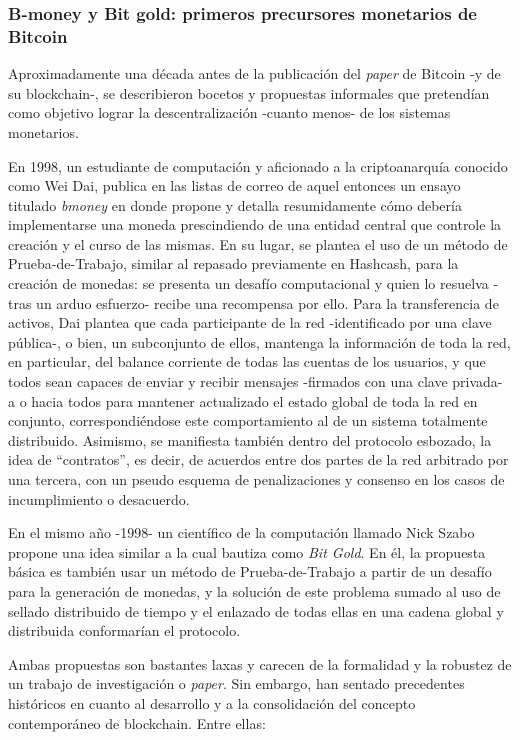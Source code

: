 \subsubsection{B-money y Bit gold: primeros precursores monetarios de Bitcoin}
\label{bc_origins_bmbg}

Aproximadamente una década antes de la publicación del \textit{paper} de Bitcoin -y de su blockchain-, se describieron bocetos y propuestas informales que pretendían como objetivo lograr la descentralización -cuanto menos- de los sistemas monetarios.

En 1998, un estudiante de computación y aficionado a la criptoanarquía conocido como Wei Dai, publica en las listas de correo de aquel entonces un ensayo titulado \textit{bmoney}\cite{Narayanan:2016:BCT:2994437}\cite{WeiDai1998} en donde propone y detalla resumidamente cómo debería implementarse una moneda prescindiendo de una entidad central que controle la creación y el curso de las mismas. En su lugar, se plantea el uso de un método de Prueba-de-Trabajo, similar al repasado previamente en Hashcash, para la creación de monedas: se presenta un desafío computacional y quien lo resuelva -tras un arduo esfuerzo- recibe una recompensa por ello. Para la transferencia de activos, Dai plantea que cada participante de la red -identificado por una clave pública-, o bien, un subconjunto de ellos, mantenga la información de toda la red, en particular, del balance corriente de todas las cuentas de los usuarios, y que todos sean capaces de enviar y recibir mensajes -firmados con una clave privada-  a o hacia todos para mantener actualizado el estado global de toda la red en conjunto, correspondiéndose este comportamiento al de un sistema totalmente distribuido. Asimismo, se manifiesta también dentro del protocolo esbozado, la idea de ``contratos'', es decir, de acuerdos entre dos partes de la red arbitrado por una tercera, con un pseudo esquema de penalizaciones y consenso en los casos de incumplimiento o desacuerdo.

En el mismo año -1998- un científico de la computación llamado Nick Szabo propone una idea similar a la cual bautiza como \textit{Bit Gold}\cite{Narayanan:2016:BCT:2994437}\cite{Szabo1998}. En él, la propuesta básica es también usar un método de Prueba-de-Trabajo a partir de un desafío para la generación de monedas, y la solución de este problema sumado al uso de sellado distribuido de tiempo y el enlazado de todas ellas en una cadena global y distribuida conformarían el protocolo.

Ambas propuestas son bastantes laxas y carecen de la formalidad y la robustez de un trabajo de investigación o \textit{paper}. Sin embargo, han sentado precedentes históricos en cuanto al desarrollo y a la consolidación del concepto contemporáneo de blockchain. Entre ellas:

